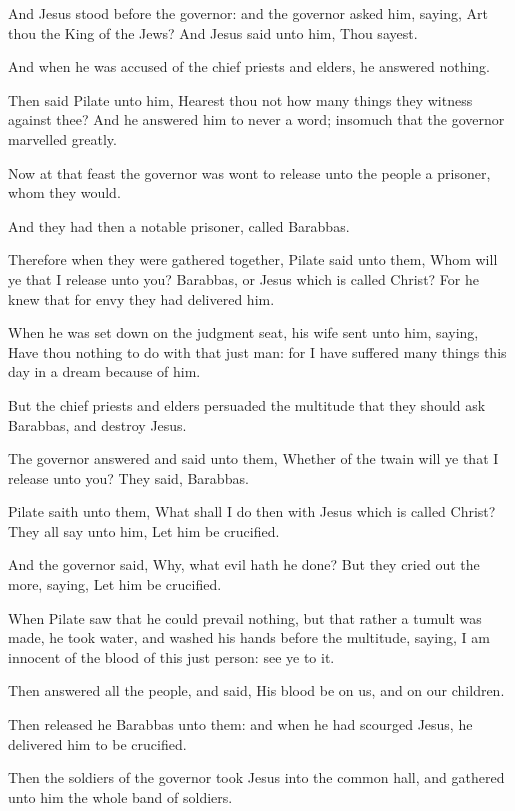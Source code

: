 \Verse And Jesus stood before the governor: and the governor asked him, saying, Art thou the King of the Jews? And Jesus said unto him, Thou sayest.

\Verse And when he was accused of the chief priests and elders, he answered nothing.

\Verse Then said Pilate unto him, Hearest thou not how many things they witness against thee?  \Verse And he answered him to never a word; insomuch that the governor marvelled greatly.

\Verse Now at that feast the governor was wont to release unto the people a prisoner, whom they would.

\Verse And they had then a notable prisoner, called Barabbas.

\Verse Therefore when they were gathered together, Pilate said unto them, Whom will ye that I release unto you? Barabbas, or Jesus which is called Christ?  \Verse For he knew that for envy they had delivered him.

\Verse When he was set down on the judgment seat, his wife sent unto him, saying, Have thou nothing to do with that just man: for I have suffered many things this day in a dream because of him.

\Verse But the chief priests and elders persuaded the multitude that they should ask Barabbas, and destroy Jesus.

\Verse The governor answered and said unto them, Whether of the twain will ye that I release unto you? They said, Barabbas.

\Verse Pilate saith unto them, What shall I do then with Jesus which is called Christ? They all say unto him, Let him be crucified.

\Verse And the governor said, Why, what evil hath he done? But they cried out the more, saying, Let him be crucified.

\Verse When Pilate saw that he could prevail nothing, but that rather a tumult was made, he took water, and washed his hands before the multitude, saying, I am innocent of the blood of this just person: see ye to it.

\Verse Then answered all the people, and said, His blood be on us, and on our children.

\Verse Then released he Barabbas unto them: and when he had scourged Jesus, he delivered him to be crucified.

\Verse Then the soldiers of the governor took Jesus into the common hall, and gathered unto him the whole band of soldiers.

